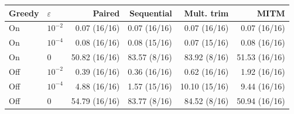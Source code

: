 \begin{tabular}{llrrrr}
\toprule
Greedy & $\varepsilon$ & Paired & Sequential & Mult. trim & MITM\\
\midrule
On & $10^{-2}$ & 0.07 (16/16) & 0.07 (16/16) & 0.07 (16/16) & 0.07 (16/16)\\
On & $10^{-4}$ & 0.08 (16/16) & 0.08 (15/16) & 0.07 (15/16) & 0.08 (16/16)\\
On & $0$ & 50.82 (16/16) & 83.57 (8/16) & 83.92 (8/16) & 51.53 (16/16)\\
Off & $10^{-2}$ & 0.39 (16/16) & 0.36 (16/16) & 0.62 (16/16) & 1.92 (16/16)\\
Off & $10^{-4}$ & 4.88 (16/16) & 1.57 (15/16) & 10.10 (15/16) & 9.44 (16/16)\\
Off & $0$ & 54.79 (16/16) & 83.77 (8/16) & 84.52 (8/16) & 50.94 (16/16)\\
\bottomrule
\end{tabular}
